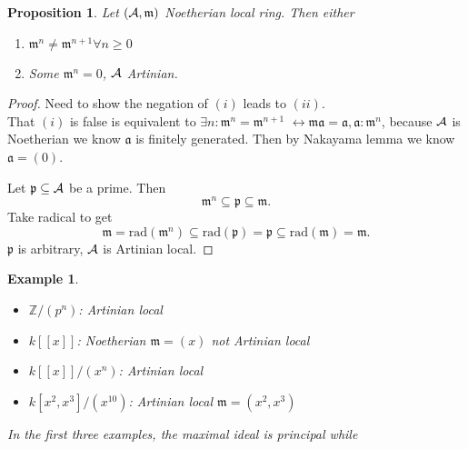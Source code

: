 \documentclass[11pt]{article}
\newtheorem{prop}[thm]{Proposition}
\newtheorem{ex}[thm]{Example}
\newcommand{\intg}{\mathbb Z}
\newcommand{\sca}{{\mathfrak a}}
\newcommand{\scm}{{\mathfrak m}}
\newcommand{\scp}{{\mathfrak p}}
\newcommand{\cala}{{\cal A}}
\newcommand{\llrta}{\longleftrightarrow}
\begin{document}
\begin{prop}\label{prop:Noetherian_local_Artinian_nilpotent}
Let $(\cala,\scm)$ Noetherian local ring. Then either 
\begin{enumerate}[label=(\roman*)]
\item $\scm^n\neq \scm^{n+1}\forall n\geq 0$
\item Some $\scm^n=0$, $\cala$ Artinian. 
\end{enumerate}
\end{prop}
\begin{proof}
Need to show the negation of $(i)$ leads to $(ii)$.\\
That $(i)$ is false is equivalent to $\exists n:\scm^n=\scm^{n+1}$ $\llrta \scm\sca=\sca,\sca:\scm^n$, because $\cala$ is Noetherian we know $\sca$ is finitely generated. Then by Nakayama lemma we know $\sca=(0)$.

Let $\scp\subseteq \cala$ be a prime. Then $$\scm^n\subseteq \scp\subseteq \scm.$$ 
Take radical to get
$$
\scm=\text{rad}(\scm^n)\subseteq\text{rad}(\scp)=\scp\subseteq \text{rad}(\scm)=\scm.
$$
$\scp$ is arbitrary, $\cala$ is Artinian   local.
\end{proof}

\begin{ex}\ 
\begin{itemize}
\item $\intg/(p^n)$: Artinian   local
\item $k[[x]]$: Noetherian $\scm=(x)$ not Artinian   local
\item $k[[x]]/(x^n)$: Artinian   local
\item $k[x^2,x^3]/(x^{10})$: Artinian   local $\scm=(x^2,x^3)$
\end{itemize}
In the first three examples, the maximal ideal is principal while 
\end{ex}
\end{document}
